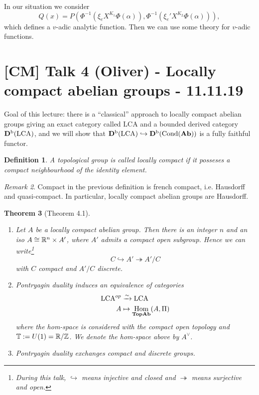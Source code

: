 \documentclass[A4paper, british]{amsart}
\theoremstyle{darkgreentheorem}
\newtheorem{thm}{Theorem}[section]
\theoremstyle{darkbluedefinition}
\newtheorem{defn}[thm]{Definition}
\theoremstyle{darkredexample}
\theoremstyle{remark}
\newtheorem{rem}[thm]{Remark}
\DeclareMathOperator{\Hom}{Hom}
\DeclareMathOperator{\Cond}{Cond}
\newcommand{\1}{\mathbbm{1}}
\newcommand{\dual}{^{\vee}}
\newcommand{\tms}{\times}
\newcommand{\epi}{\twoheadrightarrow}
\newcommand{\mono}{\hookrightarrow}
\newcommand{\LCA}{\mathrm{LCA}}
\begin{document}
In our situation we consider
\[ Q(x)=P(\Phi^{-1}(\xi_{e}X^{K_{1}}\Phi(\alpha)),\Phi^{-1}(\xi_{e}'X^{K_{2}}\Phi(\alpha))),\]
which defines a $v$-adic analytic function.
Then we can use some theory for $v$-adic functions.

\section{[CM] Talk 4 (Oliver) - Locally compact abelian groups - 11.11.19}

Goal of this lecture: there is a ``classical'' approach to locally compact abelian groups giving an exact category called $\LCA$ and a bounded derived category $\Db(\LCA)$, and we will show that $\Db(\LCA)\mono \Db(\Cond(\Ab))$ is a fully faithful functor.

\begin{defn}
    A topological group is called \textit{locally compact} if it posseses a compact neighbourhood of the identity element.
\end{defn}

\begin{rem}
    Compact in the previous definition is french compact, i.e. Hausdorff and quasi-compact.
    In particular, locally compact abelian groups are Hausdorff.
\end{rem}

\begin{thm}[Theorem 4.1]
    \begin{enumerate}[label=\roman*)]
	\item Let $A$ be a locally compact abelian group.
	    Then there is an integer $n$ and an iso $A\cong \R^{n}\tms A'$, where $A'$ admits a compact open subgroup.
	    Hence we can write\footnote{During this talk, $\mono$ means injective and closed and $\epi$ means surjective and open.}
	    \[ C\mono A'\epi A'/C \]
	    with $C$ compact and $A'/C$ discrete.
	\item Pontryagin duality induces an equivalence of categories
	    \begin{align*}
		\LCA^{op}&\xrightarrow{\sim} \LCA \\
		A & \mapsto \Hom_{\Top\Ab}(A,\Pi)
	    \end{align*}
	    where the hom-space is considered with the compact open topology and $\mathbb{T}:=U(1)=\mathbb{R}/\mathbb{Z}$.
	    We denote the hom-space above by $A\dual$.
	\item Pontryagin duality exchanges compact and discrete groups.
    \end{enumerate}
\end{thm}
\end{document}
